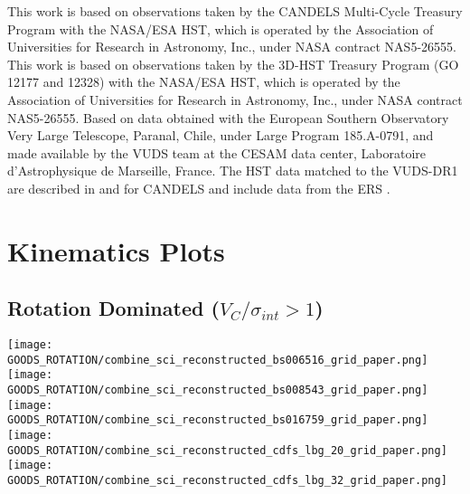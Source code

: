 \documentclass[fleqn,usenatbib]{mn2e}
\begin{document}
This work is based on observations taken by the CANDELS Multi-Cycle Treasury Program with the NASA/ESA HST, which is operated by the Association of Universities for Research in Astronomy, Inc., under NASA contract NAS5-26555.
This work is based on observations taken by the 3D-HST Treasury Program (GO 12177 and 12328) with the NASA/ESA HST, which is operated by the Association of Universities for Research in Astronomy, Inc., under NASA contract NAS5-26555.
Based on data obtained with the European Southern Observatory Very Large Telescope, Paranal, Chile, under Large Program 185.A-0791, and made available by the VUDS team at the CESAM data center, Laboratoire d'Astrophysique de Marseille, France.
The HST data matched to the VUDS-DR1 are described in \cite{Grogin2011} and \cite{Koekemoer2011} for CANDELS and include data from the ERS \cite{Windhorst2011}.




%


\clearpage 

%


\clearpage


\appendix

\section{Kinematics Plots}\label{app:kinematics_plots}
\subsection{Rotation Dominated ($V_{C}/\sigma_{int} > 1$)}\label{app:rotation_dominated}

\begin{figure*}
\centering
\texttt{[image: GOODS\_ROTATION/combine\_sci\_reconstructed\_bs006516\_grid\_paper.png]}
\texttt{[image: GOODS\_ROTATION/combine\_sci\_reconstructed\_bs008543\_grid\_paper.png]}
\texttt{[image: GOODS\_ROTATION/combine\_sci\_reconstructed\_bs016759\_grid\_paper.png]}
\texttt{[image: GOODS\_ROTATION/combine\_sci\_reconstructed\_cdfs\_lbg\_20\_grid\_paper.png]}
\texttt{[image: GOODS\_ROTATION/combine\_sci\_reconstructed\_cdfs\_lbg\_32\_grid\_paper.png]}
\label{fig:goods_rot_1}
\end{figure*}
\end{document}
